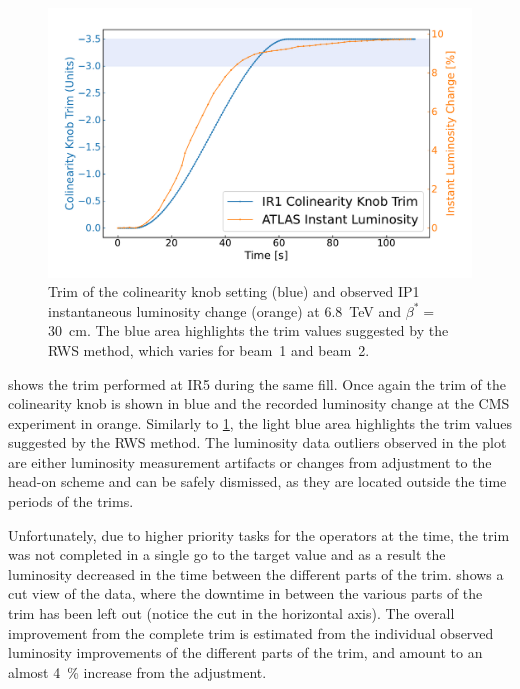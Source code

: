 \begin{figure}[!htb]
    \centering
    \includegraphics*[width=\textwidth]{Figures/IR_Coupling_Correction/corrections_trim_ir1.pdf}
    \caption{Trim of the colinearity knob setting (\textcolor{mplblue}{blue}) and observed IP\num{1} instantaneous luminosity change (\textcolor{mplorange}{orange}) at \qty{6.8}{\tera\electronvolt} and \(\beta^{\ast} = \) \qty{30}{cm}. The blue area highlights the trim values suggested by the RWS method, which varies for beam~\num{1} and beam~\num{2}.}
    \label{figure:corrections_trims_ir1}
\end{figure}

 shows the trim performed at IR\num{5} during the same fill.
Once again the trim of the colinearity knob is shown in \textcolor{mplblue}{blue} and the recorded luminosity change at the CMS experiment in \textcolor{mplorange}{orange}.
Similarly to \cref{figure:corrections_trims_ir1}, the light blue area highlights the trim values suggested by the RWS method.
The luminosity data outliers observed in the plot are either luminosity measurement artifacts or changes from adjustment to the head-on scheme and can be safely dismissed, as they are located outside the time periods of the trims.

Unfortunately, due to higher priority tasks for the operators at the time, the trim was not completed in a single go to the target value and as a result the luminosity decreased in the time between the different parts of the trim.
 shows a cut view of the data, where the downtime in between the various parts of the trim has been left out (notice the cut in the horizontal axis).
The overall improvement from the complete trim is estimated from the individual observed luminosity improvements of the different parts of the trim, and amount to an almost \qty{4}{\percent} increase from the adjustment.

